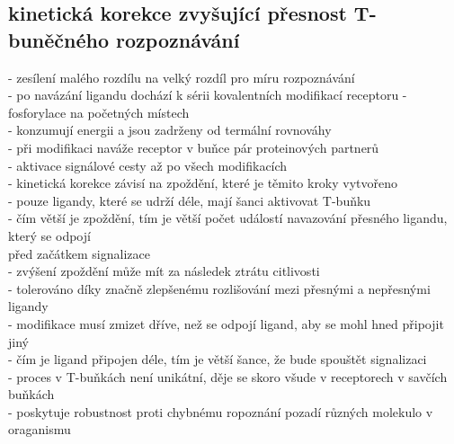 \documentclass[11pt,a4paper]{report}
\begin{document}
\subsection{kinetická korekce zvyšující přesnost T-buněčného rozpoznávání}
- zesílení malého rozdílu na velký rozdíl pro míru rozpoznávání\\
- po navázání ligandu dochází k sérii kovalentních modifikací receptoru - fosforylace na početných místech\\
\indent - konzumují energii a jsou zadrženy od termální rovnováhy\\
- při modifikaci naváže receptor v buňce pár proteinových partnerů\\
- aktivace signálové cesty až po všech modifikacích\\
- kinetická korekce závisí na zpoždění, které je těmito kroky vytvořeno\\
\indent - pouze ligandy, které se udrží déle, mají šanci aktivovat T-buňku\\
\indent - čím větší je zpoždění, tím je větší počet událostí navazování přesného ligandu, který se odpojí\\
\indent \indent před začátkem signalizace\\
\indent \indent - zvýšení zpoždění může mít za následek ztrátu citlivosti\\
\indent \indent \indent - tolerováno díky značně zlepšenému rozlišování mezi přesnými a nepřesnými ligandy\\
\indent - modifikace musí zmizet dříve, než se odpojí ligand, aby se mohl hned připojit jiný\\
\indent - čím je ligand připojen déle, tím je větší šance, že bude spouštět signalizaci\\
- proces v T-buňkách není unikátní, děje se skoro všude v receptorech v savčích buňkách\\
- poskytuje robustnost proti chybnému ropoznání pozadí různých molekulo v oraganismu\\
\end{document}
